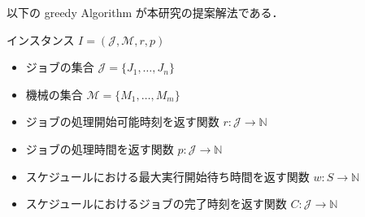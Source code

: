 \documentclass[12pt]{optlab-bachelor}
\begin{document}
以下の {\sc greedy Algorithm} が本研究の提案解法である．

インスタンス $I = (\mathcal{J}, \mathcal{M}, r, p)$
\begin{itemize}
  \item ジョブの集合 $\mathcal{J} = \{J_1,\ldots,J_n\}$
  \item 機械の集合 $\mathcal{M} = \{M_1,\ldots,M_m\}$
  \item ジョブの処理開始可能時刻を返す関数 $r : \mathcal{J} \to \mathbb{N}$
  \item ジョブの処理時間を返す関数 $p : \mathcal{J} \to \mathbb{N}$
  \item スケジュールにおける最大実行開始待ち時間を返す関数 $w : S \to \mathbb{N}$
  \item スケジュールにおけるジョブの完了時刻を返す関数 $C : \mathcal{J} \to \mathbb{N}$

\end{itemize}
\end{document}
